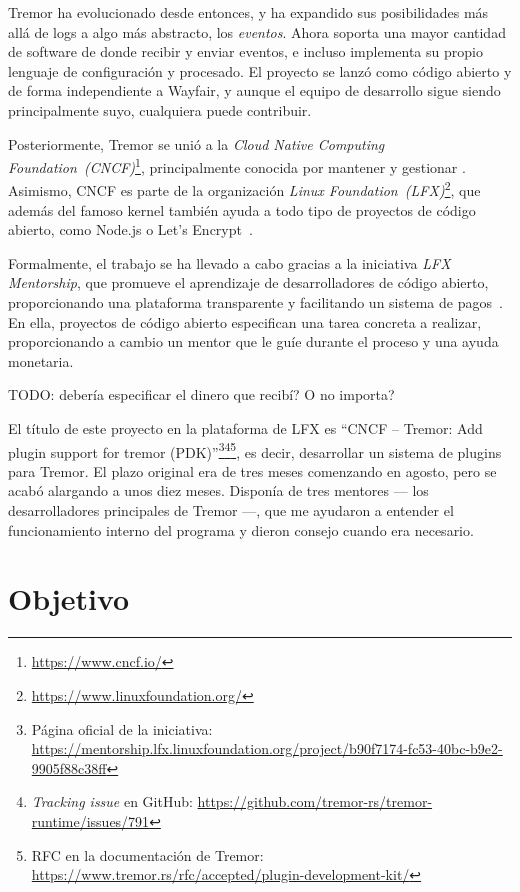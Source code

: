Tremor ha evolucionado desde entonces, y ha expandido sus posibilidades más allá
de logs a algo más abstracto, los \emph{eventos}. Ahora soporta una mayor
cantidad de software de donde recibir y enviar eventos, e incluso implementa su
propio lenguaje de configuración y procesado. El proyecto se lanzó como código
abierto y de forma independiente a Wayfair, y aunque el equipo de desarrollo
sigue siendo principalmente suyo, cualquiera puede contribuir.

Posteriormente, Tremor se unió a la \emph{Cloud Native Computing
Foundation~(CNCF)}\footnote{\url{https://www.cncf.io/}}, principalmente conocida
por mantener y gestionar \textcite{k8s}. Asimismo, CNCF es parte de la
organización \emph{Linux
Foundation~(LFX)}\footnote{\url{https://www.linuxfoundation.org/}}, que además
del famoso kernel también ayuda a todo tipo de proyectos de código abierto, como
Node.js o Let's Encrypt~\cite{lfx_projects}.

Formalmente, el trabajo se ha llevado a cabo gracias a la iniciativa \emph{LFX
Mentorship}, que promueve el aprendizaje de desarrolladores de código abierto,
proporcionando una plataforma transparente y facilitando un sistema de
pagos~\cite{lfx_mentorship}. En ella, proyectos de código abierto especifican
una tarea concreta a realizar, proporcionando a cambio un mentor que le guíe
durante el proceso y una ayuda monetaria.

TODO: debería especificar el dinero que recibí? O no importa?

El título de este proyecto en la plataforma de LFX es ``CNCF -- Tremor: Add
plugin support for tremor (PDK)''\footnote{Página oficial de la iniciativa:
\url{https://mentorship.lfx.linuxfoundation.org/project/b90f7174-fc53-40bc-b9e2-9905f88c38ff}}\footnote{\emph{Tracking
issue} en GitHub:
\url{https://github.com/tremor-rs/tremor-runtime/issues/791}}\footnote{RFC en la
documentación de Tremor:
\url{https://www.tremor.rs/rfc/accepted/plugin-development-kit/}}, es decir,
desarrollar un sistema de plugins para Tremor. El plazo original era de tres
meses comenzando en agosto, pero se acabó alargando a unos diez meses. Disponía
de tres mentores --- los desarrolladores principales de Tremor ---, que me
ayudaron a entender el funcionamiento interno del programa y dieron consejo
cuando era necesario.

\section{Objetivo}

